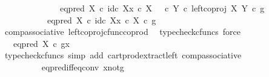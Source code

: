 \begin{isabellebody}
\ \ \ \ \isamarkupfalse%
\ {\isacharminus}{\kern0pt}\isanewline
\ \ \ \ \ \ \isamarkupfalse%
\ {\isachardoublequoteopen}{\isacharparenleft}{\kern0pt}eq{\isacharunderscore}{\kern0pt}pred\ X\ {\isasymcirc}\isactrlsub c\ {\isasymlangle}id\isactrlsub c\ X{\isacharcomma}{\kern0pt}x\ {\isasymcirc}\isactrlsub c\ {\isasymbeta}\isactrlbsub X\isactrlesub {\isasymrangle}{\isacharparenright}{\kern0pt}\ {\isasymamalg}\ {\isacharparenleft}{\kern0pt}{\isasymf}\ {\isasymcirc}\isactrlsub c\ {\isasymbeta}\isactrlbsub Y\isactrlesub {\isacharparenright}{\kern0pt}\ {\isasymcirc}\isactrlsub c\ left{\isacharunderscore}{\kern0pt}coproj\ X\ Y\ {\isasymcirc}\isactrlsub c\ g\isanewline
\ \ \ \ \ \ \ \ \ \ {\isacharequal}{\kern0pt}\ {\isacharparenleft}{\kern0pt}eq{\isacharunderscore}{\kern0pt}pred\ X\ {\isasymcirc}\isactrlsub c\ {\isasymlangle}id\isactrlsub c\ X{\isacharcomma}{\kern0pt}x\ {\isasymcirc}\isactrlsub c\ {\isasymbeta}\isactrlbsub X\isactrlesub {\isasymrangle}{\isacharparenright}{\kern0pt}\ {\isasymcirc}\isactrlsub c\ g{\isachardoublequoteclose}\isanewline
\ \ \ \ \ \ \ \ \isamarkupfalse%
\ comp{\isacharunderscore}{\kern0pt}associative{}\ left{\isacharunderscore}{\kern0pt}coproj{\isacharunderscore}{\kern0pt}cfunc{\isacharunderscore}{\kern0pt}coprod\ \isamarkupfalse%
\ {\isacharparenleft}{\kern0pt}typecheck{\isacharunderscore}{\kern0pt}cfuncs{\isacharcomma}{\kern0pt}\ force{\isacharparenright}{\kern0pt}\isanewline
\ \ \ \ \ \ \isamarkupfalse%
\ \isamarkupfalse%
\ {\isachardoublequoteopen}{\isachardot}{\kern0pt}{\isachardot}{\kern0pt}{\isachardot}{\kern0pt}\ {\isacharequal}{\kern0pt}\ eq{\isacharunderscore}{\kern0pt}pred\ X\ {\isasymcirc}\isactrlsub c\ {\isasymlangle}g{\isacharcomma}{\kern0pt}x{\isasymrangle}{\isachardoublequoteclose}\isanewline
\ \ \ \ \ \ \ \ \isamarkupfalse%
\ {\isacharparenleft}{\kern0pt}typecheck{\isacharunderscore}{\kern0pt}cfuncs{\isacharcomma}{\kern0pt}\ simp\ add{\isacharcolon}{\kern0pt}\ cart{\isacharunderscore}{\kern0pt}prod{\isacharunderscore}{\kern0pt}extract{\isacharunderscore}{\kern0pt}left\ comp{\isacharunderscore}{\kern0pt}associative{}{\isacharparenright}{\kern0pt}\isanewline
\ \ \ \ \ \ \isamarkupfalse%
\ \isamarkupfalse%
\ {\isachardoublequoteopen}{\isachardot}{\kern0pt}{\isachardot}{\kern0pt}{\isachardot}{\kern0pt}\ {\isacharequal}{\kern0pt}\ {\isasymf}{\isachardoublequoteclose}\isanewline
\ \ \ \ \ \ \ \ \isamarkupfalse%
\ eq{\isacharunderscore}{\kern0pt}pred{\isacharunderscore}{\kern0pt}iff{\isacharunderscore}{\kern0pt}eq{\isacharunderscore}{\kern0pt}conv\ x{\isacharunderscore}{\kern0pt}not{\isacharunderscore}{\kern0pt}g\ \isamarkupfalse%

\end{isabellebody}
